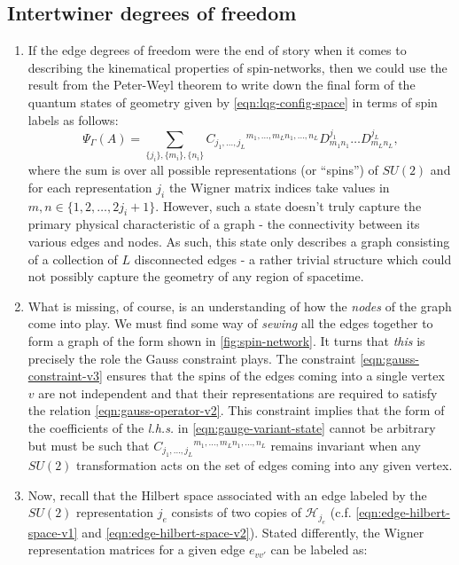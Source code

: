 \documentclass[preprint]{SciPost}
\newcommand{\mc}[1]{\mathcal{#1}}
\theoremstyle{plain} %
\begin{document}
\subsection*{Intertwiner degrees of freedom}
	\begin{enumerate}[label=\arabic*.]
		\item If the edge degrees of freedom were the end of story when it comes to describing the kinematical properties of spin-networks, then we could use the result from the Peter-Weyl theorem to write down the final form of the quantum states of geometry given by \eqref{eqn:lqg-config-space} in terms of spin labels as follows:
		\begin{equation}\label{eqn:gauge-variant-state}
			\Psi_\Gamma(A) = \underset{\{j_i\},\{m_i\},\{n_i\}}{\sum} C_{j_1,\ldots,j_{L}}{}^{m_1,\ldots,m_{L} n_1,\ldots, n_{L}} D^{j_1}_{m_1 n_1} \ldots D^{j_{L}}_{m_{L} n_{L}},
		\end{equation}
		where the sum is over all possible representations (or ``spins'') of $ SU(2) $ and for each representation $ j_i $ the Wigner matrix indices take values in $ m,n \in \{1,2,\ldots,2j_i + 1\} $. However, such a state doesn't truly capture the primary physical characteristic of a graph - the connectivity between its various edges and nodes. As such, this state only describes a graph consisting of a collection of $ L $ disconnected edges - a rather trivial structure which could not possibly capture the geometry of any region of spacetime.
		\item What is missing, of course, is an understanding of how the \emph{nodes} of the graph come into play. We must find some way of \emph{sewing} all the edges together to form a graph of the form shown in \autoref{fig:spin-network}. It turns that \emph{this} is precisely the role the Gauss constraint plays. The constraint \eqref{eqn:gauss-constraint-v3} ensures that the spins of the edges coming into a single vertex $ v $ are not independent and that their representations are required to satisfy the relation \eqref{eqn:gauss-operator-v2}. This constraint implies that the form of the coefficients of the \emph{l.h.s.} in \eqref{eqn:gauge-variant-state} cannot be arbitrary but must be such that $ C_{j_1,\ldots,j_{L}}{}^{m_1,\ldots,m_{L} n_1,\ldots, n_{L}} $ remains invariant when any $ SU(2) $ transformation acts on the set of edges coming into any given vertex.
		\item Now, recall that the Hilbert space associated with an edge labeled by the $ SU(2) $ representation $ j_e $ consists of two copies of $ \mc{H}_{j_e} $ (c.f. \eqref{eqn:edge-hilbert-space-v1} and \eqref{eqn:edge-hilbert-space-v2}). Stated differently, the Wigner representation matrices for a given edge $ e_{vv'} $ can be labeled as:

\end{enumerate}
\end{document}
